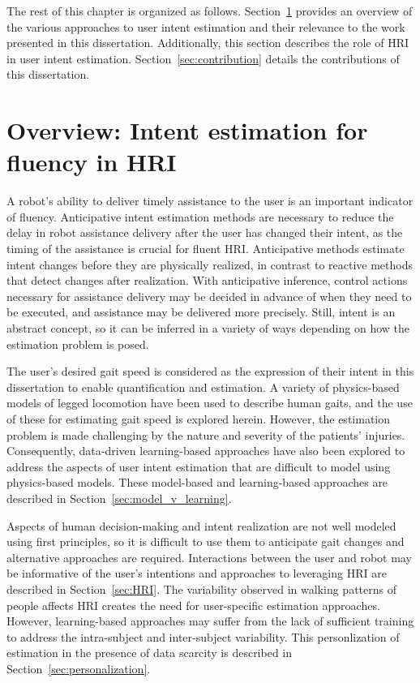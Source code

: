 The rest of this chapter is organized as follows. Section~\ref{sec:overview} provides an overview of the various approaches to user intent estimation and their relevance to the work presented in this dissertation. Additionally, this section describes the role of HRI in user intent estimation. Section~\ref{sec:contribution} details the contributions of this dissertation.

\section{Overview: Intent estimation for fluency in HRI} \label{sec:overview}

A robot's ability to deliver timely assistance to the user is an important indicator of fluency. Anticipative intent estimation methods are necessary to reduce the delay in robot assistance delivery after the user has changed their intent, as the timing of the assistance is crucial for fluent HRI. Anticipative methods estimate intent changes before they are physically realized, in contrast to reactive methods that detect changes after realization. With anticipative inference, control actions necessary for assistance delivery may be decided in advance of when they need to be executed, and assistance may be delivered more precisely. Still, intent is an abstract concept, so it can be inferred in a variety of ways depending on how the estimation problem is posed. 

The user's desired gait speed is considered as the expression of their intent in this dissertation to enable quantification and estimation. A variety of physics-based models of legged locomotion have been used to describe human gaits, and the use of these for estimating gait speed is explored herein. However, the estimation problem is made challenging by the nature and severity of the patients' injuries. Consequently, data-driven learning-based approaches have also been explored to address the aspects of user intent estimation that are difficult to model using physics-based models. These model-based and learning-based approaches are described in Section~\ref{sec:model_v_learning}. 

Aspects of human decision-making and intent realization are not well modeled using first principles, so it is difficult to use them to anticipate gait changes and alternative approaches are required. Interactions between the user and robot may be informative of the user's intentions and approaches to leveraging HRI are described in Section~\ref{sec:HRI}. The variability observed in walking patterns of people affects HRI creates the need for user-specific estimation approaches. However, learning-based approaches may suffer from the lack of sufficient training to address the intra-subject and inter-subject variability. This personlization of estimation in the presence of data scarcity is described in Section~\ref{sec:personalization}.

